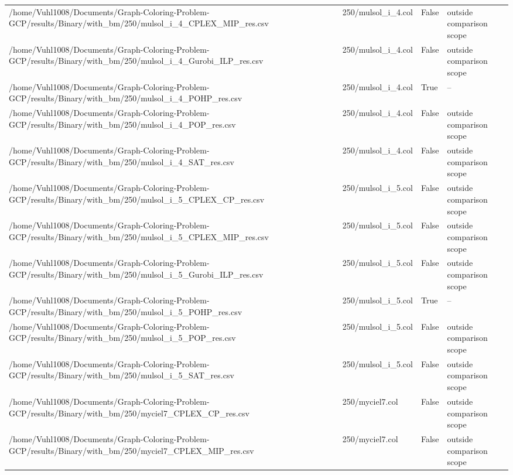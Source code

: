 \begin{table}[htbp]
\begin{tabular}{llll}
/home/Vuhl1008/Documents/Graph-Coloring-Problem-GCP/results/Binary/with\_bm/250/mulsol\_i\_4\_CPLEX\_MIP\_res.csv & 250/mulsol\_i\_4.col & False & outside comparison scope \\
/home/Vuhl1008/Documents/Graph-Coloring-Problem-GCP/results/Binary/with\_bm/250/mulsol\_i\_4\_Gurobi\_ILP\_res.csv & 250/mulsol\_i\_4.col & False & outside comparison scope \\
/home/Vuhl1008/Documents/Graph-Coloring-Problem-GCP/results/Binary/with\_bm/250/mulsol\_i\_4\_POHP\_res.csv & 250/mulsol\_i\_4.col & True & -- \\
/home/Vuhl1008/Documents/Graph-Coloring-Problem-GCP/results/Binary/with\_bm/250/mulsol\_i\_4\_POP\_res.csv & 250/mulsol\_i\_4.col & False & outside comparison scope \\
/home/Vuhl1008/Documents/Graph-Coloring-Problem-GCP/results/Binary/with\_bm/250/mulsol\_i\_4\_SAT\_res.csv & 250/mulsol\_i\_4.col & False & outside comparison scope \\
/home/Vuhl1008/Documents/Graph-Coloring-Problem-GCP/results/Binary/with\_bm/250/mulsol\_i\_5\_CPLEX\_CP\_res.csv & 250/mulsol\_i\_5.col & False & outside comparison scope \\
/home/Vuhl1008/Documents/Graph-Coloring-Problem-GCP/results/Binary/with\_bm/250/mulsol\_i\_5\_CPLEX\_MIP\_res.csv & 250/mulsol\_i\_5.col & False & outside comparison scope \\
/home/Vuhl1008/Documents/Graph-Coloring-Problem-GCP/results/Binary/with\_bm/250/mulsol\_i\_5\_Gurobi\_ILP\_res.csv & 250/mulsol\_i\_5.col & False & outside comparison scope \\
/home/Vuhl1008/Documents/Graph-Coloring-Problem-GCP/results/Binary/with\_bm/250/mulsol\_i\_5\_POHP\_res.csv & 250/mulsol\_i\_5.col & True & -- \\
/home/Vuhl1008/Documents/Graph-Coloring-Problem-GCP/results/Binary/with\_bm/250/mulsol\_i\_5\_POP\_res.csv & 250/mulsol\_i\_5.col & False & outside comparison scope \\
/home/Vuhl1008/Documents/Graph-Coloring-Problem-GCP/results/Binary/with\_bm/250/mulsol\_i\_5\_SAT\_res.csv & 250/mulsol\_i\_5.col & False & outside comparison scope \\
/home/Vuhl1008/Documents/Graph-Coloring-Problem-GCP/results/Binary/with\_bm/250/myciel7\_CPLEX\_CP\_res.csv & 250/myciel7.col & False & outside comparison scope \\
/home/Vuhl1008/Documents/Graph-Coloring-Problem-GCP/results/Binary/with\_bm/250/myciel7\_CPLEX\_MIP\_res.csv & 250/myciel7.col & False & outside comparison scope \\

\end{tabular}
\end{table}
